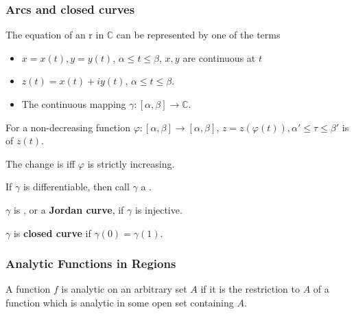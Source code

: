 \subsubsection{Arcs and closed curves}
The equation of an  r in  $ \mathbb{C} $ can  be represented by one of the terms
\begin{itemize}
    \item  $ x=x(t),y=y(t) $, $ \alpha \leq t  \leq \beta$,  $ x,y $ are continuous at  $ t $
    \item  $ z(t)=x(t)+iy(t) $, $ \alpha \leq t \leq \beta $.
    \item The  continuous mapping  $ \gamma:[\alpha,\beta]\rightarrow \mathbb{C} $. 
\end{itemize}
For a non-decreasing function  $ \varphi:[\alpha,\beta]\rightarrow[\alpha,\beta] $,  $ z=z(\varphi(t)),\alpha' \leq \tau \leq \beta' $ is   of  $ z(t) $.

The change is  iff  $ \varphi  $ is strictly increasing. 

If  $ \gamma  $ is differentiable, then call  $ \gamma  $ a .

$ \gamma  $ is , or a   \textbf{Jordan curve}, if  $ \gamma $ is injective.

$ \gamma  $ is   \textbf{closed curve} if  $ \gamma(0)=\gamma(1) $.  
\subsubsection{Analytic Functions in Regions}
A function  $ f  $ is analytic on an arbitrary set  $ A  $ if it is  the restriction to  $ A  $ of a function which is analytic in some open set containing  $ A  $. 